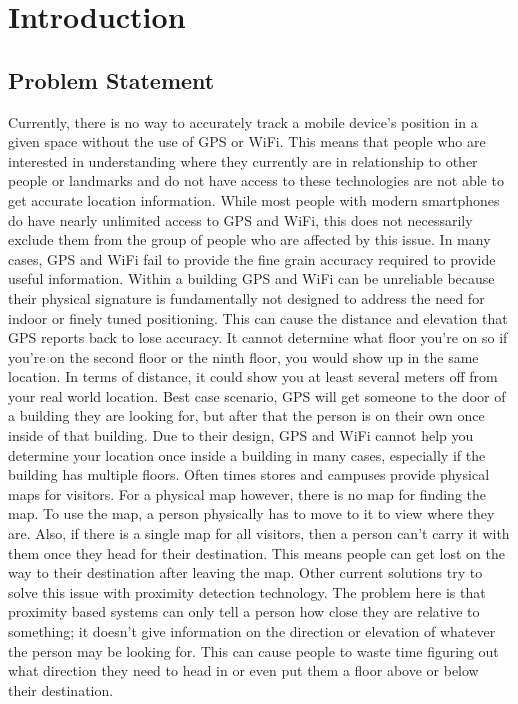 \chapter{Introduction}

\section{Problem Statement}

Currently, there is no way to accurately track a mobile device’s position in a given space without the use of GPS or WiFi.
This means that people who are interested in understanding where they currently are in relationship to other people or landmarks and do
not have access to these technologies are not able to get accurate location information.
While most people with modern smartphones do have nearly unlimited access to GPS and WiFi, this does not necessarily exclude them
from the group of people who are affected by this issue.  In many cases, GPS and WiFi fail to provide the fine grain accuracy required
to provide useful information.  Within a building GPS and WiFi can be unreliable because their physical signature is fundamentally not
designed to address the need for indoor or finely tuned positioning. This can cause the distance and elevation that GPS reports back to
lose accuracy. It cannot determine what floor you’re on so if you’re on the second floor or the ninth floor, you would show up in the
same location. In terms of distance, it could show you at least several meters off from your real world location.
Best case scenario, GPS will get someone to the door of a building they are looking for, but after that the person is on their own once
inside of that building. Due to their design, GPS and WiFi cannot help you determine your location once inside a building in many cases,
especially if the building has multiple floors. Often times stores and campuses provide physical maps for visitors. For a physical map
however, there is no map for finding the map. To use the map, a person physically has to move to it to view where they are. Also, if
there is a single map for all visitors, then a person can’t carry it with them once they head for their destination. This means people
can get lost on the way to their destination after leaving the map. Other current solutions try to solve this issue with proximity
detection technology. The problem here is that proximity based systems can only tell a person how close they are relative to something;
it doesn’t give information on the direction or elevation of whatever the person may be looking for. This can cause people to waste time
figuring out what direction they need to head in or even put them a floor above or below their destination.

